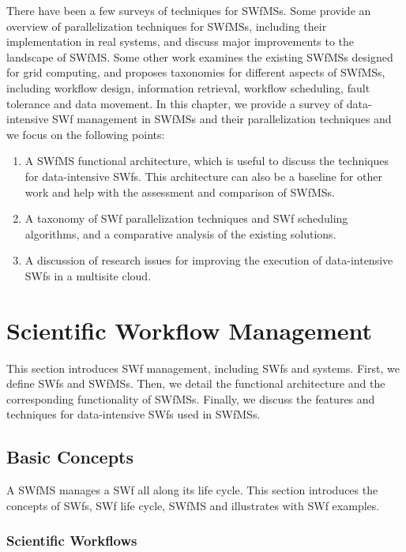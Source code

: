 There have been a few surveys of techniques for SWfMSs.
Some \cite{Bux2013} provide an overview of parallelization techniques for SWfMSs, including their implementation
in real systems, and discuss major improvements to the landscape of SWfMS.
Some other work \cite{Yu2005} examines the existing SWfMSs designed for
grid computing, and proposes taxonomies for different aspects of SWfMSs, including workflow design, information retrieval, 
workflow scheduling, fault tolerance and data movement.
In this chapter, we provide a survey of data-intensive SWf management in 
SWfMSs and their parallelization techniques and we focus on the following points:
\begin{enumerate}
\item A SWfMS functional architecture, which is useful to discuss the techniques for data-intensive SWfs.
This architecture can also be a baseline for other work and help with the assessment and comparison of SWfMSs.
\item A taxonomy of SWf parallelization techniques and SWf scheduling algorithms, and a comparative
analysis of the existing solutions.
\item A discussion of research issues for improving the execution of data-intensive SWfs in a multisite cloud.
\end{enumerate}


\section{Scientific Workflow Management }
\label{sec:SOASWM}

This section introduces SWf management, including
SWfs and systems. First, we define SWfs and SWfMSs. Then, we detail the functional
architecture and the corresponding functionality of SWfMSs. Finally,
we discuss the features and techniques for data-intensive SWfs
used in SWfMSs.


\subsection{Basic Concepts}

A SWfMS manages a SWf all along its life cycle. This
section introduces the concepts of SWfs, SWf life cycle, SWfMS and illustrates with SWf examples.


\subsubsection{Scientific Workflows}

